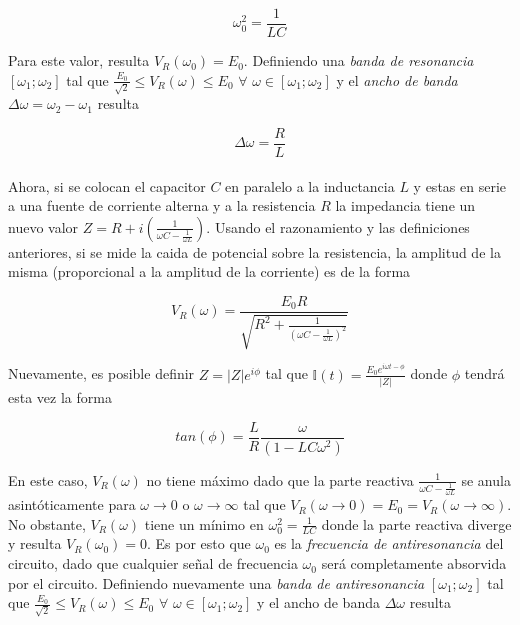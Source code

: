 \documentclass[11pt,a4paper]{article}
\begin{document}
\begin{equation}
\omega_{0}^2= \frac{1}{LC}
\label{eq:F_res}
\end{equation}

Para este valor, resulta $V_R(\omega_0) = E_{0}$. Definiendo una \textit{banda de resonancia} $[\omega_1;\omega_2]$ tal que $\frac{E_0}{\sqrt{2}} \leq V_R(\omega) \leq E_{0}$ $\forall$ $\omega \in [\omega_1;\omega_2]$ y el \textit{ancho de banda} $\Delta\omega = \omega_2 - \omega_1$ resulta

\begin{equation}
\Delta\omega = \frac{R}{L}
\label{deltaomega}
\end{equation}\\

Ahora, si se colocan el capacitor $C$ en paralelo a la inductancia $L$ y estas en serie a una fuente de corriente alterna y a la resistencia $R$ la impedancia tiene un nuevo valor $Z = R+ i(\frac{1}{\omega C - \frac{1}{\omega L}})$. Usando el razonamiento y las definiciones anteriores, si se mide la caida de potencial sobre la resistencia, la amplitud de la misma (proporcional a la amplitud de la corriente) es de la forma

\begin{equation}
V_{R} (\omega) = \frac{E_0R}{\sqrt{R^2 + \frac{1}{(\omega C - \frac{1}{\omega L})^2}}}
\label{eq:3}
\end{equation}

Nuevamente, es posible definir $Z = |Z|e^{i\phi}$ tal que $\mathbb{I}(t) = \frac{E_0e^{i\omega t-\phi}}{|Z|}$ donde $\phi$ tendrá esta vez la forma

\begin{equation}
tan(\phi) = \frac{L}{R}\frac{\omega}{(1- LC\omega^2)} 
\label{eq:4}
\end{equation}

En este caso, $V_{R} (\omega)$ no tiene máximo dado que la parte reactiva $\frac{1}{\omega C - \frac{1}{\omega L}}$ se anula asintóticamente para $\omega \longrightarrow 0$ o $\omega \longrightarrow \infty$  tal que $V_R(\omega \rightarrow 0) = E_0 = V_R(\omega \rightarrow \infty)$. No obstante, $V_{R} (\omega)$ tiene un mínimo en $\omega_0^2 = \frac{1}{LC}$ donde la parte reactiva diverge y resulta $V_{R} (\omega_0)=0$. Es por esto que $\omega_0$ es la \textit{frecuencia de antiresonancia} del circuito, dado que cualquier señal de frecuencia $\omega_0$ será completamente absorvida por el circuito. Definiendo nuevamente una \textit{banda de antiresonancia} $[\omega_1;\omega_2]$ tal que $\frac{E_0}{\sqrt{2}} \leq V_R(\omega) \leq E_{0}$ $\forall$ $\omega \in [\omega_1;\omega_2]$ y el ancho de banda $\Delta\omega$ resulta
\end{document}
